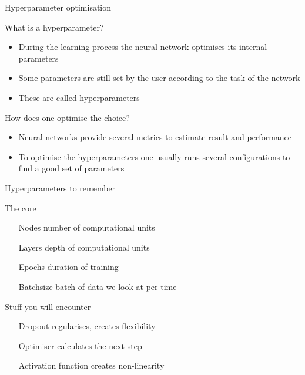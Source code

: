 \begin{frame}{Hyperparameter optimisation}
    \begin{block}{What is a hyperparameter?}
        \begin{itemize}
            \item During the learning process the neural network optimises its internal parameters
            \item Some parameters are still set by the user according to the task of the network
            \item These are called hyperparameters
        \end{itemize}
        
    \end{block}
    \begin{block}{How does one optimise the choice?}
        \begin{itemize}
            \item Neural networks provide several metrics to estimate result and performance
            \item To optimise the hyperparameters one usually runs several configurations to find a good set of parameters
        \end{itemize}
    \end{block}
\end{frame}


\begin{frame}{Hyperparameters to remember}
    \begin{block}{The core}
        \begin{enumerate}
            \item[Nodes] number of computational units
            \item[Layers] depth of computational units
            \item[Epochs] duration of training
            \item[Batchsize] batch of data we look at per time
        \end{enumerate}
    \end{block}
    \begin{block}{Stuff you will encounter}
        \begin{enumerate}
            \item[Dropout] regularises, creates flexibility
            \item[Optimiser] calculates the next step
            \item[Activation function] creates non-linearity
    \end{enumerate}
    \end{block}
\end{frame}